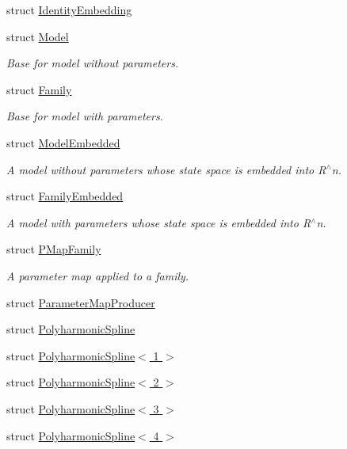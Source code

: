 \begin{DoxyCompactItemize}
struct \hyperlink{struct_d_r_d_s_p_1_1_identity_embedding}{Identity\-Embedding}
\item 
struct \hyperlink{struct_d_r_d_s_p_1_1_model}{Model}
\begin{DoxyCompactList}\small\item\em Base for model without parameters. \end{DoxyCompactList}\item 
struct \hyperlink{struct_d_r_d_s_p_1_1_family}{Family}
\begin{DoxyCompactList}\small\item\em Base for model with parameters. \end{DoxyCompactList}\item 
struct \hyperlink{struct_d_r_d_s_p_1_1_model_embedded}{Model\-Embedded}
\begin{DoxyCompactList}\small\item\em A model without parameters whose state space is embedded into R$^\wedge$n. \end{DoxyCompactList}\item 
struct \hyperlink{struct_d_r_d_s_p_1_1_family_embedded}{Family\-Embedded}
\begin{DoxyCompactList}\small\item\em A model with parameters whose state space is embedded into R$^\wedge$n. \end{DoxyCompactList}\item 
struct \hyperlink{struct_d_r_d_s_p_1_1_p_map_family}{P\-Map\-Family}
\begin{DoxyCompactList}\small\item\em A parameter map applied to a family. \end{DoxyCompactList}\item 
struct \hyperlink{struct_d_r_d_s_p_1_1_parameter_map_producer}{Parameter\-Map\-Producer}
\item 
struct \hyperlink{struct_d_r_d_s_p_1_1_polyharmonic_spline}{Polyharmonic\-Spline}
\item 
struct \hyperlink{struct_d_r_d_s_p_1_1_polyharmonic_spline_3_011_01_4}{Polyharmonic\-Spline$<$ 1 $>$}
\item 
struct \hyperlink{struct_d_r_d_s_p_1_1_polyharmonic_spline_3_012_01_4}{Polyharmonic\-Spline$<$ 2 $>$}
\item 
struct \hyperlink{struct_d_r_d_s_p_1_1_polyharmonic_spline_3_013_01_4}{Polyharmonic\-Spline$<$ 3 $>$}
\item 
struct \hyperlink{struct_d_r_d_s_p_1_1_polyharmonic_spline_3_014_01_4}{Polyharmonic\-Spline$<$ 4 $>$}

\end{DoxyCompactItemize}
